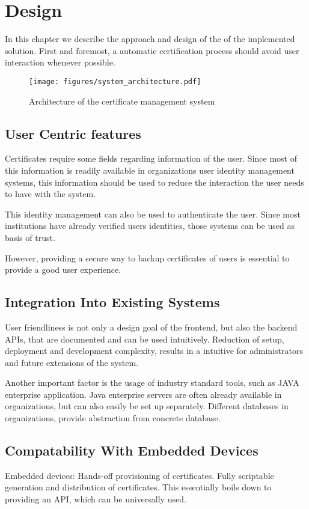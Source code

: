 \chapter{Design}\label{ch:design}

In this chapter we describe the approach and design of the of the implemented solution.
First and foremost, a automatic certification process should avoid user interaction whenever possible.

\begin{figure}
    \centering
    \texttt{[image: figures/system\_architecture.pdf]}
    \caption{Architecture of the certificate management system}
    \label{fig:systemArchitecture}
\end{figure}

\section{User Centric features}\label{sec:userDetails}
Certificates require some fields regarding information of the user.
Since most of this information is readily available in organizations user identity management systems, this information
should be used to reduce the interaction the user needs to have with the system.

This identity management can also be used to authenticate the user.
Since most institutions have already verified users identities, those systems can be used as basis of trust.

However, providing a secure way to backup certificates of users is essential to provide a good user experience.

\section{Integration Into Existing Systems}\label{sec:integrationIntoExistingSystems}
User friendliness is not only a design goal of the frontend, but also the backend APIs, that are documented and can be
used intuitively.
Reduction of setup, deployment and development complexity, results in a intuitive for administrators and future
extensions of the system.

Another important factor is the usage of industry standard tools, such as JAVA enterprise application.
Java enterprise servers are often already available in organizations, but can also easily be set up separately.
Different databases in organizations, provide abstraction from concrete database.

\section{Compatability With Embedded Devices}\label{sec:compatabilityWithEmbeddedDevices}
Embedded devices: Hands-off provisioning of certificates.
Fully scriptable generation and distribution of certificates.
This essentially boils down to providing an API, which can be universally used.


